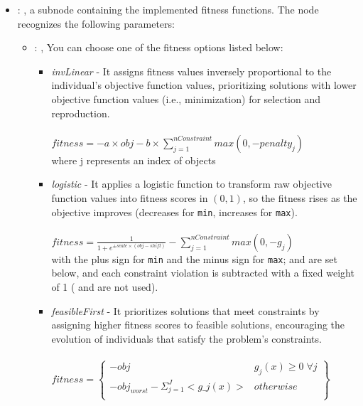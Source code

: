 \begin{itemize}
\begin{itemize}
        \item {}: ,
          a subnode containing the implemented fitness functions.
          The  node recognizes the following parameters:
            \begin{itemize}
              \item {}: ,
                You can choose one of the fitness options listed below:
                \begin{itemize}                         \item \textit{invLinear} - It assigns
                fitness values inversely proportional to the individual's objective function values,
                prioritizing solutions with lower objective function values (i.e., minimization) for
                selection and reproduction.\\\\                         $fitness = -a \times obj - b
                \times \sum_{j=1}^{nConstraint} max(0,-penalty_{j}) $\\
                where j represents an index of objects                         \\
                \item \textit{logistic} - It applies a logistic function to transform raw objective
                function values into fitness scores in $(0, 1)$,                         so the
                fitness rises as the objective improves (decreases for \texttt{min}, increases for
                \texttt{max}).\\\\                         $fitness = \frac{1}{1+e^{\pm
                scale\times(obj-shift)}} - \sum_{j=1}^{nConstraint} max(0,-g_{j})$\\
                with the plus sign for \texttt{min} and the minus sign for \texttt{max};
                 and  are set                         below, and each
                constraint violation is subtracted with a fixed weight of 1 ( and
                 are not used).\\                         \item \textit{feasibleFirst} -
                It prioritizes solutions that meet constraints by assigning higher fitness scores to
                feasible solutions,                          encouraging the evolution of
                individuals that satisfy the problem's constraints.\\\\
                $fitness = \left\{\begin{matrix} -obj & g_{j}(x)\geq 0 \; \forall j \\ -obj_{worst}-
                \Sigma_{j=1}^{J}<g\_j(x)> & otherwise \\ \end{matrix}\right\}$\\
                \end{itemize}
          \end{itemize}


\end{itemize}
\end{itemize}
